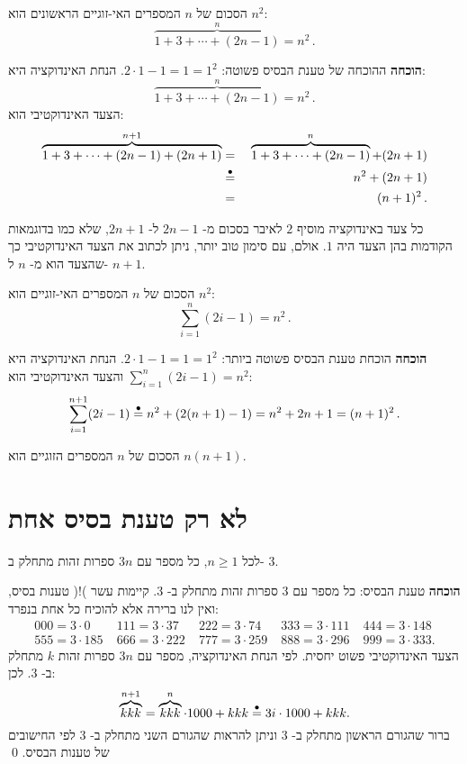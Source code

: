 \begin{theorem}
הסכום של
$n$
המספרים האי-זוגיים הראשונים הוא
$n^2$:
\[
\overbrace{1 + 3 + \cdots + (2n-1)}^{n} = n^2\,.
\]
\end{theorem}
\vspace{-5ex}
\textbf{הוכחה}
ההוכחה של טענת הבסיס פשוטה:
$2\cdot 1-1=1=1^2$.
הנחת האינדוקציה היא:
\[
\overbrace{1 + 3 + \cdots + (2n-1)}^{n} = n^2\,.
\]
הצעד האינדוקטיבי הוא:
\begin{eqnarray*}
\overbrace{1 + 3 + \cdots + (2n-1) + (2n+1)}^{n+1} &=& \overbrace{1 + 3 + \cdots + (2n-1)}^{n} + (2n+1)\\
&\stackrel{\bullet}{=}{}& n^2 + (2n+1)\\
&=&(n+1)^2\,.
\end{eqnarray*}


כל צעד באינדוקציה מוסיף
$2$
לאיבר בסכום מ-%
$2n-1$
ל-%
$2n+1$,
שלא כמו בדוגמאות הקודמות בהן הצעד היה
$1$.
אולם, עם סימון טוב יותר, ניתן לכתוב את הצעד האינדוקטיבי כך שהצעד הוא מ-%
$n$
ל-%
$n+1$.
\begin{theorem}
הסכום של
$n$
המספרים האי-זוגיים הוא
$n^2$:
\[
\sum_{i=1}^n (2i-1) = n^2\,.
\]
\end{theorem}
\textbf{הוכחה}
הוכחת טענת הבסיס פשוטה ביותר:
$2\cdot 1-1=1=1^2$.
הנחת האינדוקציה היא
$\sum_{i=1}^n (2i-1) = n^2$
והצעד האינדוקטיבי הוא:
\[
\sum_{i=1}^{n+1} (2i-1) \stackrel{\bullet}{=}{} n^2 + (2(n+1)-1) = n^2 + 2n + 1 = (n+1)^2\,.
\]


\begin{exercise}
הסכום של
$n$
המספרים הזוגיים הוא
$n(n+1)$.
\end{exercise}

\section{%
לא רק טענת בסיס אחת%
}

\begin{theorem}\label{th.three}
לכל
$n\geq 1$,
כל מספר עם
$3n$
ספרות זהות מתחלק ב-%
$3$.
\end{theorem}

\textbf{הוכחה}
טענת הבסיס: כל מספר עם
$3$
ספרות זהות מתחלק ב-%
$3$.
קיימות עשר )!( טענות בסיס, ואין לנו ברירה אלא להוכיח כל אחת בנפרד:
\[
\begin{array}{lllll}
000=3\cdot 0 & \;111 = 3\cdot 37 & \;222 = 3\cdot 74 &
\;333=3\cdot 111 & \;444=3\cdot 148\\
555=3\cdot 185 & \;666=3\cdot 222 & \;777=3\cdot 259 &
\;888=3\cdot 296 & \;999=3\cdot 333.
\end{array}
\]
הצעד האינדוקטיבי פשוט יחסית. לפי הנחת האינדוקציה, מספר עם
$3n$
ספרות זהות
$k$
מתחלק ב-%
$3$.
לכן:
\[
\overbrace{kkk}^{n+1} = \overbrace{kkk}^{n}\cdot 1000 + kkk \stackrel{\bullet}{=}{}
3i\cdot 1000 + kkk.
\]
ברור שהגורם הראשון מתחלק ב-%
$3$
וניתן להראות שהגורם השני מתחלק ב-%
$3$
לפי החישובים של טענות הבסיס.
\qed

